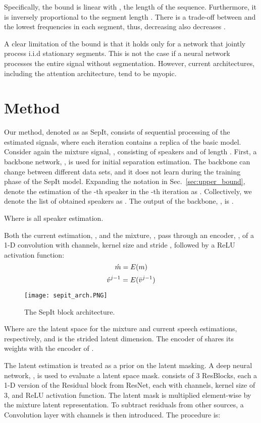 \documentclass[a4paper]{article}
\theoremstyle{plain}
\theoremstyle{definition}
\theoremstyle{remark}
\begin{document}
Specifically, the bound is linear with , the length of the sequence. Furthermore, it is inversely proportional to the segment length . There is a trade-off between  and the lowest frequencies in each segment, thus, decreasing  also decreases .


A clear limitation of the bound is that it holds only for a network  that jointly process i.i.d stationary segments. This is not the case if a neural network processes the entire signal without segmentation. However, current architectures, including the attention architecture, tend to be myopic.


\section{Method}
\label{sec:method}
Our method, denoted as as SepIt, consists of sequential processing of the estimated signals, where each iteration contains a replica of the basic model.
Consider again the mixture signal, , consisting of  speakers and of length .
First, a backbone network, , is used for initial separation estimation. The backbone can change between different data sets, and it does not learn during the training phase of the SepIt model. 
Expanding the notation in Sec.~\ref{sec:upper_bound}, denote the estimation of the -th speaker in the -th iteration as . Collectively, we denote the list of obtained speakers as . The output of the backbone, , is .

Where  is all speaker estimation.

Both the current estimation, , and the mixture, , pass through an encoder, , of a 1-D convolution with  channels, kernel size  and stride , followed by a ReLU activation function:
\begin{dmath}
    \Acute{m} = E(m)
\end{dmath}
\begin{dmath}
    \Acute{v}^{j-1} = E(\bar{v}^{j-1})
\end{dmath}
\begin{figure}[b]
    \centering
     \texttt{[image: sepit\_arch.PNG]}
    \caption{The SepIt block architecture.
}
    \label{fig:sepitblock}
\end{figure}
Where   are the latent space for the mixture and current speech estimations, respectively, and  is the strided latent dimension.
The encoder of  shares its weights with the encoder of .

The latent estimation  is treated as a prior on the latent masking. A deep neural network, , is used to evaluate a latent space mask.
 consists of 3 ResBlocks, each a 1-D version of the Residual block from ResNet, each with  channels, kernel size of 3, and ReLU activation function. 
The latent mask is multiplied element-wise by the mixture latent representation. 
To subtract residuals from other sources, a  Convolution layer  with  channels is then introduced. The procedure is:
\end{document}
